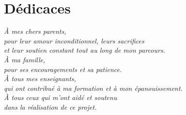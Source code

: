 \chapter*{Dédicaces}

\vspace*{3cm}

\begin{center}
\textit{\large 
À mes chers parents, \\
pour leur amour inconditionnel, leurs sacrifices \\
et leur soutien constant tout au long de mon parcours. \\[2cm]

À ma famille, \\
pour ses encouragements et sa patience. \\[2cm]

À tous mes enseignants, \\
qui ont contribué à ma formation et à mon épanouissement. \\[2cm]

À tous ceux qui m'ont aidé et soutenu \\
dans la réalisation de ce projet.
}
\end{center}

\vfill

\newpage